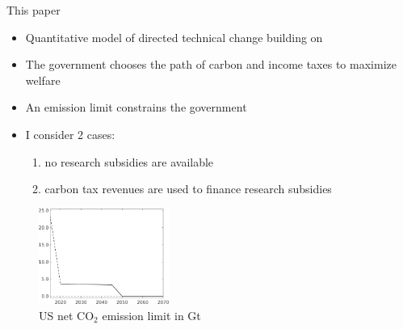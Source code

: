\documentclass[11pt,aspectratio=169]{beamer}
\begin{document}
\begin{frame}{This paper}
	\vspace{-2mm}
	\begin{itemize}
		\item<+-> Quantitative model of \alert{directed technical change}  building on \cite{Fried2018ClimateAnalysis}
		\vspace{2mm}
		\item<+->   The government   chooses the \alert{path of carbon and income taxes} to maximize welfare\vspace{2mm}
		\item<+-> An \alert{emission limit} constrains the government 
		\vspace{2mm}
		\item<+-> I consider 2 cases:
				\begin{enumerate}
			\item no research subsidies are available
			\item carbon tax revenues are used to finance research subsidies
				\end{enumerate}
		
	\end{itemize}
	\pause
	\begin{center}
		\begin{figure}
			\centering
			\caption{US net CO$_2$ emission limit in Gt}
			\includegraphics[width=0.38\textwidth]{../codding_model/own_basedOnFried/optimalPol_010922_revision/figures/all_13Sept22_Tplus30/Emnet.png}
		\end{figure}
	\end{center}
\end{frame}
\end{document}
